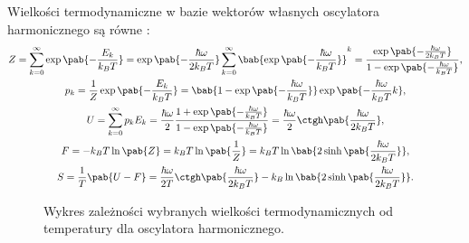 Wielkości termodynamiczne w bazie wektorów własnych oscylatora harmonicznego są równe \cite{kieu}:
\begin{gather}
	Z = \sum_{k=0}^{\infty} \exp\pab{-\frac{E_k}{k_B T}} =
	\exp\pab{-\frac{\hbar\omega}{2k_B T}} \sum_{k=0}^{\infty} \bab{\exp\pab{-\frac{\hbar\omega}{k_B T}}}^k =
	\frac{\exp\pab{-\frac{\hbar\omega}{2k_B T}}}{1-\exp\pab{-\frac{\hbar\omega}{k_B T}}}, \label{eq:osc_harm_Z} \\
	p_k = \inv{Z}\exp\pab{-\frac{E_k}{k_B T}} =
	\bab{1-\exp\pab{-\frac{\hbar\omega}{k_B T}}}\exp\pab{-\frac{\hbar\omega}{k_B T}k}, \label{eq:osc_harm_pk} \\
	U = \sum_{k=0}^{\infty} p_k E_k = \frac{\hbar\omega}{2} \frac{1+\exp\pab{-\frac{\hbar\omega}{k_B T}}}{1-\exp\pab{-\frac{\hbar\omega}{k_B T}}} =
	\frac{\hbar\omega}{2} \ctgh\pab{\frac{\hbar\omega}{2k_B T}}, \label{eq:osc_harm_U} \\
	F = - k_B T \ln\pab{Z} = k_B T \ln\pab{\inv{Z}} =
	k_B T \ln\bab{2\sinh\pab{\frac{\hbar\omega}{2k_B T}}}, \label{eq:osc_harm_F} \\
	S = \inv{T}\pab{U-F} =
	\frac{\hbar\omega}{2T}\ctgh\pab{\frac{\hbar\omega}{2k_B T}} - k_B \ln\bab{2\sinh\pab{\frac{\hbar\omega}{2k_B T}}}. \label{eq:osc_harm_S}
\end{gather}

\begin{figure}
	\centering
	
	\caption{Wykres zależności wybranych wielkości termodynamicznych od temperatury dla oscylatora harmonicznego.}
	\label{fig:wykres_osc_harm}
\end{figure}
